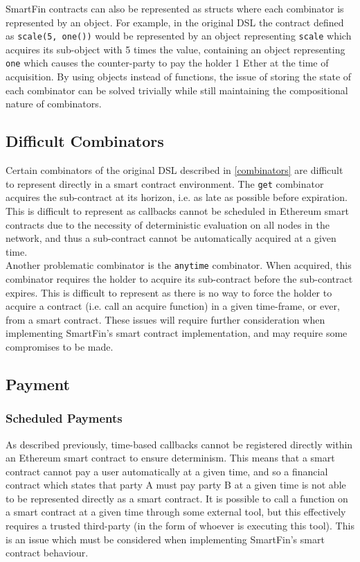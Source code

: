 SmartFin contracts can also be represented as structs where each combinator is represented by an object. For example, in the original DSL the contract defined as \texttt{scale(5, one())} would be represented by an object representing \texttt{scale} which acquires its sub-object with 5 times the value, containing an object representing \texttt{one} which causes the counter-party to pay the holder 1 Ether at the time of acquisition. By using objects instead of functions, the issue of storing the state of each combinator can be solved trivially while still maintaining the compositional nature of combinators.


\subsection{Difficult Combinators}

Certain combinators of the original DSL described in \ref{combinators} are difficult to represent directly in a smart contract environment. The \texttt{get} combinator acquires the sub-contract at its horizon, i.e. as late as possible before expiration. This is difficult to represent as callbacks cannot be scheduled in Ethereum smart contracts due to the necessity of deterministic evaluation on all nodes in the network, and thus a sub-contract cannot be automatically acquired at a given time. \\

Another problematic combinator is the \texttt{anytime} combinator. When acquired, this combinator requires the holder to acquire its sub-contract before the sub-contract expires. This is difficult to represent as there is no way to force the holder to acquire a contract (i.e. call an acquire function) in a given time-frame, or ever, from a smart contract. These issues will require further consideration when implementing SmartFin's smart contract implementation, and may require some compromises to be made.


\subsection{Payment}

\subsubsection{Scheduled Payments}

As described previously, time-based callbacks cannot be registered directly within an Ethereum smart contract to ensure determinism. This means that a smart contract cannot pay a user automatically at a given time, and so a financial contract which states that party A must pay party B at a given time is not able to be represented directly as a smart contract. It is possible to call a function on a smart contract at a given time through some external tool, but this effectively requires a trusted third-party (in the form of whoever is executing this tool). This is an issue which must be considered when implementing SmartFin's smart contract behaviour.

